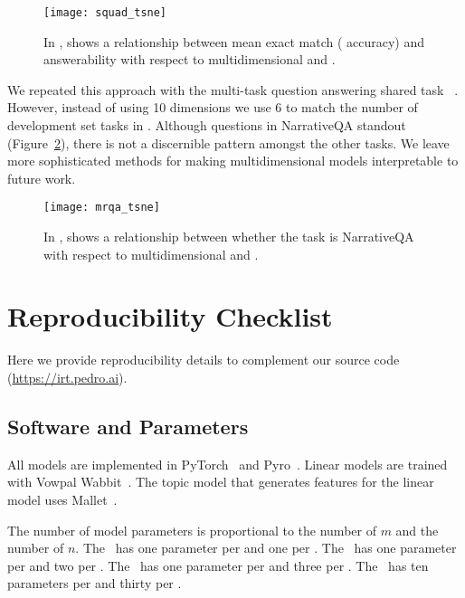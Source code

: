 \begin{figure}[t]
  \centering
  \texttt{[image: squad\_tsne]}
  \caption{
    In \squad{},  shows a relationship between mean exact match (\itm{} accuracy) and answerability with respect to multidimensional \diff{} and \discability{}.
  }
  \label{fig:tsne-squad}
\end{figure}

We repeated this approach with the multi-task question answering shared task ~\citep{fisch2019mrqa}.
However, instead of using 10 dimensions we use 6 to match the number of development set tasks in .
Although questions in NarrativeQA standout (Figure~\ref{fig:tsne-mrqa}), there is not a discernible pattern amongst the other tasks.
We leave more sophisticated methods for making multidimensional \irt{} models interpretable to future work.

\begin{figure}[t]
  \centering
  \texttt{[image: mrqa\_tsne]}
  \caption{
    In ,  shows a relationship between whether the task is NarrativeQA with respect to multidimensional \diff{} and \discability{}.
  }
  \label{fig:tsne-mrqa}
\end{figure}



\section{Reproducibility Checklist}

Here we provide reproducibility details to complement our source code (\href{https://irt.pedro.ai}{https://irt.pedro.ai}).

\subsection{Software and Parameters}

All \irt{} models are implemented in PyTorch~\citep{pytorch2019} and Pyro~\citep{bingham2018pyro}.
Linear models are trained with Vowpal Wabbit~\citep{Agarwal2014ARE}.
The topic model that generates features for the linear model uses Mallet~\citep{McCallumMALLET}.

The number of \irt{} model parameters is proportional to the number of \subjs{} $m$ and the number of \itms{} $n$.
The ~has one parameter per \subj{} and one per \itm{}.
The ~has one parameter per \subj{} and two per \itm{}.
The ~has one parameter per \subj{} and three per \itm{}.
The ~has ten parameters per \subj{} and thirty per \itm{}.

